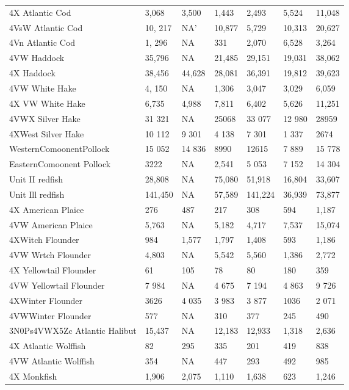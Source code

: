 \documentclass[11pt]{book}
\begin{document}
\begin{landscapepage}
\begin{longtable}[t]{lllllll}
\endfoot
\bottomrule
\endlastfoot
4X Atlantic Cod & 3,068 & 3,500 & 1,443 & 2,493 & 5,524 & 11,048\\
4VsW Atlantic Cod & 10, 217 & NA' & 10,877 & 5,729 & 10,313 & 20,627\\
4Vn Atlantic Cod & 1, 296 & NA & 331 & 2,070 & 6,528 & 3,264\\
4VW Haddock & 35,796 & NA & 21,485 & 29,151 & 19,031 & 38,062\\
4X Haddock & 38,456 & 44,628 & 28,081 & 36,391 & 19,812 & 39,623\\
4VW White Hake & 4, 150 & NA & 1,306 & 3,047 & 3,029 & 6,059\\
4X VW White Hake & 6,735 & 4,988 & 7,811 & 6,402 & 5,626 & 11,251\\
4VWX Silver Hake & 31 321 & NA & 25068 & 33 077 & 12 980 & 28959\\
4XWest Silver Hake & 10 112 & 9 301 & 4 138 & 7 301 & 1 337 & 2674\\
WesternComoonentPollock & 15 052 & 14 836 & 8990 & 12615 & 7 889 & 15 778\\
EasternComoonent Pollock & 3222 & NA & 2,541 & 5 053 & 7 152 & 14 304\\
Unit II redfish & 28,808 & NA & 75,080 & 51,918 & 16,804 & 33,607\\
Unit Ill redfish & 141,450 & NA & 57,589 & 141,224 & 36,939 & 73,877\\
4X American Plaice & 276 & 487 & 217 & 308 & 594 & 1,187\\
4VW American Plaice & 5,763 & NA & 5,182 & 4,717 & 7,537 & 15,074\\
4XWitch Flounder & 984 & 1,577 & 1,797 & 1,408 & 593 & 1,186\\
4VW Wrtch Flounder & 4,803 & NA & 5,542 & 5,560 & 1,386 & 2,772\\
4X Yellowtail Flounder & 61 & 105 & 78 & 80 & 180 & 359\\
4VW Yellowtail Flounder & 7 984 & NA & 4 675 & 7 194 & 4 863 & 9 726\\
4XWinter Flounder & 3626 & 4 035 & 3 983 & 3 877 & 1036 & 2 071\\
4VWWinter Flounder & 577 & NA & 310 & 377 & 245 & 490\\
3N0Ps4VWX5Zc Atlantic Halibut & 15,437 & NA & 12,183 & 12,933 & 1,318 & 2,636\\
4X Atlantic Wolffish & 82 & 295 & 335 & 201 & 419 & 838\\
4VW Atlantic Wolffish & 354 & NA & 447 & 293 & 492 & 985\\
4X Monkfish & 1,906 & 2,075 & 1,110 & 1,638 & 623 & 1,246\\

\end{longtable}
\end{landscapepage}
\end{document}
